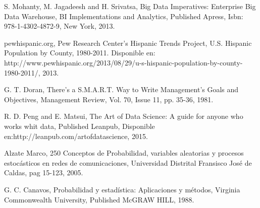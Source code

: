 \documentclass[conference]{IEEEtran}\usepackage[]{graphicx}\usepackage[]{color}
\begin{document}
	\newpage
	 \begin{thebibliography}{1}
	 	
	 	S. Mohanty, M. Jagadeesh and H. Srivatsa, Big Data Imperatives: Enterprise Big Data Warehouse, BI Implementations and Analytics, Published Apress, Isbn: 978-1-4302-4872-9, New York, 2013.
	 	
	 	pewhispanic.org, Pew Research Center’s Hispanic Trends Project, U.S. Hispanic Population by County, 1980-2011. Disponible en: http://www.pewhispanic.org/2013/08/29/u-s-hispanic-population-by-county-1980-2011/, 2013.
	 	 	
	 	G. T. Doran, There's a S.M.A.R.T. Way to Write Management's Goals and Objectives, Management Review, Vol. 70, Issue 11, pp. 35-36, 1981.
	 	
	 	R. D. Peng and E. Matsui, The Art of Data Science: A guide for anyone who works whit data, Published Leanpub, Disponible en:http://leanpub.com/artofdatascience, 2015.
	 	 	
	 	Alzate Marco, 250 Conceptos de Probabilidad, variables aleatorias y procesos estocásticos en redes de comunicaciones, Universidad Distrital Fransisco José de Caldas, pag 15-123, 2005.
	 	
 		G. C. Canavos, Probabilidad y estadística: Aplicaciones y métodos, Virginia Commonwealth University, Published McGRAW HILL, 1988.
	 	
	 \end{thebibliography}
	
\end{document}
